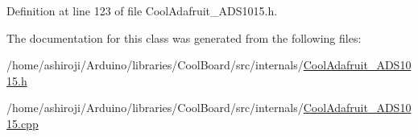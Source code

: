 Definition at line 123 of file Cool\+Adafruit\+\_\+\+A\+D\+S1015.\+h.



The documentation for this class was generated from the following files\+:\begin{DoxyCompactItemize}
\item 
/home/ashiroji/\+Arduino/libraries/\+Cool\+Board/src/internals/\hyperlink{_cool_adafruit___a_d_s1015_8h}{Cool\+Adafruit\+\_\+\+A\+D\+S1015.\+h}\item 
/home/ashiroji/\+Arduino/libraries/\+Cool\+Board/src/internals/\hyperlink{_cool_adafruit___a_d_s1015_8cpp}{Cool\+Adafruit\+\_\+\+A\+D\+S1015.\+cpp}\end{DoxyCompactItemize}
